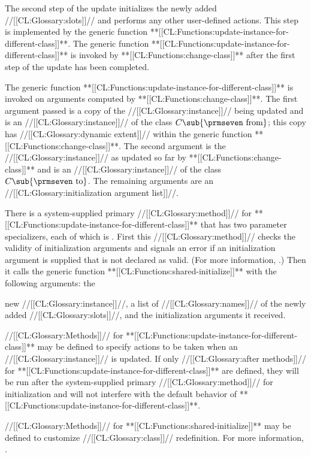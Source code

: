 \endsubsection%


The second step of the update initializes the newly added //[[CL:Glossary:slots]]// and
performs any other user-defined actions.  This step is implemented by
the generic function **[[CL:Functions:update-instance-for-different-class]]**.  The
generic function **[[CL:Functions:update-instance-for-different-class]]** is invoked
by **[[CL:Functions:change-class]]** after the first step of the update has been
completed.

The generic function **[[CL:Functions:update-instance-for-different-class]]** is
invoked on arguments computed by **[[CL:Functions:change-class]]**.
The first argument passed is a copy of the //[[CL:Glossary:instance]]// being updated 
and is an //[[CL:Glossary:instance]]// of the class $C\sub {\hbox{{\prmseven from}}}$; 
this copy has //[[CL:Glossary:dynamic extent]]// within the generic function **[[CL:Functions:change-class]]**.  
The second argument is the //[[CL:Glossary:instance]]// as updated so far by **[[CL:Functions:change-class]]**
and is an //[[CL:Glossary:instance]]// of the class $C\sub {\hbox{{\prmseven to}}}$.
The remaining arguments are an //[[CL:Glossary:initialization argument list]]//.






There is a system-supplied primary //[[CL:Glossary:method]]// for 
**[[CL:Functions:update-instance-for-different-class]]** that has two parameter
specializers, each of which is .  First
this //[[CL:Glossary:method]]// checks the validity of initialization arguments and
signals an error if an initialization argument is supplied that is not
declared as valid.  (For more information, \seesection\DeclaringInitargValidity.)
Then it calls the
generic function **[[CL:Functions:shared-initialize]]** with the following arguments:
the

new
//[[CL:Glossary:instance]]//, a list of //[[CL:Glossary:names]]// of the newly added 
//[[CL:Glossary:slots]]//, and the
initialization arguments it received.

\endsubsection%

             
//[[CL:Glossary:Methods]]// for **[[CL:Functions:update-instance-for-different-class]]** may be defined
to specify actions to be taken when an //[[CL:Glossary:instance]]// is updated.  If only
//[[CL:Glossary:after methods]]// for **[[CL:Functions:update-instance-for-different-class]]** are
defined, they will be run after the system-supplied primary //[[CL:Glossary:method]]// for
initialization and will not interfere with the default behavior of
**[[CL:Functions:update-instance-for-different-class]]**.









//[[CL:Glossary:Methods]]// 
for **[[CL:Functions:shared-initialize]]** may be defined to customize //[[CL:Glossary:class]]//
redefinition.  For more information, \seesection\SharedInitialize.
  
\endsubsection%

